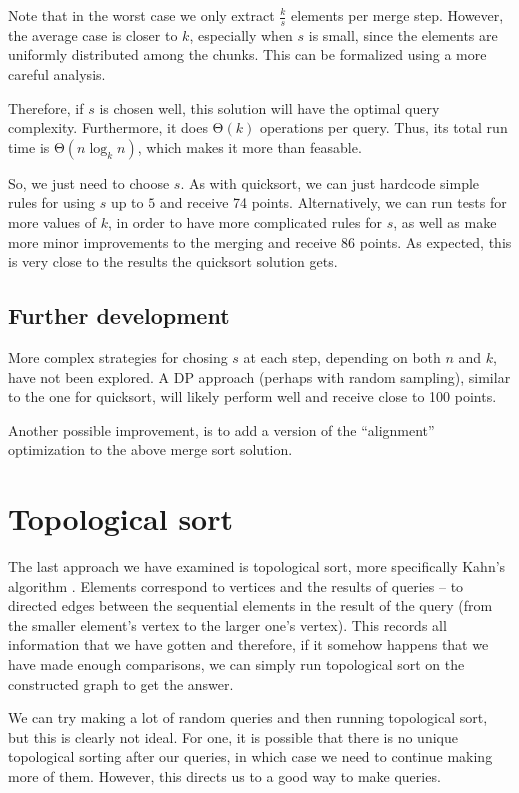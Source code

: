 \documentclass{article}
\begin{document}
Note that in the worst case we only extract $ \frac{k}{s} $ elements per merge step. However, the average case is closer to $ k $, especially when $ s $ is small, since the elements are uniformly distributed among the chunks. This can be formalized using a more careful analysis.

Therefore, if $ s $ is chosen well, this solution will have the optimal query complexity. Furthermore, it does $ \mathrm{\Theta}\left( k \right) $ operations per query. Thus, its total run time is $ \mathrm{\Theta}\left( n \log_k{n} \right) $, which makes it more than feasable.

So, we just need to choose $ s $. As with quicksort, we can just hardcode simple rules for using $ s $ up to $ 5 $ and receive 74 points. Alternatively, we can run tests for more values of $ k $, in order to have more complicated rules for $ s $, as well as make more minor improvements to the merging and receive 86 points. As expected, this is very close to the results the quicksort solution gets.

\subsection{Further development}

More complex strategies for chosing $ s $ at each step, depending on both $ n $ and $ k $, have not been explored. A DP approach (perhaps with random sampling), similar to the one for quicksort, will likely perform well and receive close to 100 points.

Another possible improvement, is to add a version of the ``alignment'' optimization to the above merge sort solution.

\section{Topological sort}

The last approach we have examined is topological sort, more specifically Kahn's algorithm \cite{topsort}. Elements correspond to vertices and the results of queries -- to directed edges between the sequential elements in the result of the query (from the smaller element's vertex to the larger one's vertex). This records all information that we have gotten and therefore, if it somehow happens that we have made enough comparisons, we can simply run topological sort on the constructed graph to get the answer.

We can try making a lot of random queries and then running topological sort, but this is clearly not ideal. For one, it is possible that there is no unique topological sorting after our queries, in which case we need to continue making more of them. However, this directs us to a good way to make queries.
\end{document}
